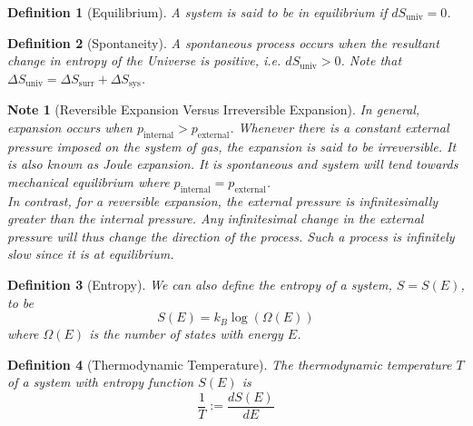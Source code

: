\documentclass[a4paper]{article}
\newtheorem{Note}{Note}[section]
\theoremstyle{new}
\newtheorem{defi}{Definition}[section]
\begin{document}
\begin{defi}[Equilibrium]
A system is said to be in equilibrium if $dS_{\text{univ}}=0$.
\end{defi}
\begin{defi}[Spontaneity]
A spontaneous process occurs when the resultant change in entropy of the Universe is positive, i.e. $dS_{\text{univ}}>0$. Note that $\Delta S_{\text{univ}}=\Delta S_{\text{surr}}+\Delta S_{\text{sys}}$.
\end{defi}
\begin{Note}[Reversible Expansion Versus Irreversible Expansion]
In general, expansion occurs when $p_{\text{internal}}>p_{\text{external}}$. Whenever there is a constant external pressure imposed on the system of gas, the expansion is said to be irreversible. It is also known as Joule expansion. It is spontaneous and system will tend towards mechanical equilibrium where $p_{\text{internal}}=p_{\text{external}}$.\\[5pt]
In contrast, for a reversible expansion, the external pressure is infinitesimally greater than the internal pressure. Any infinitesimal change in the external pressure will thus change the direction of the process. Such a process is infinitely slow since it is at equilibrium.
\end{Note}
\begin{defi}[Entropy]
We can also define the entropy of a system, $S=S(E)$, to be 
\begin{equation}
S(E)=k_B\log(\Omega(E))\label{entropy}
\end{equation}
where $\Omega(E)$ is the number of states with energy $E$.
\end{defi}
\begin{defi}[Thermodynamic Temperature]
The thermodynamic temperature $T$ of a system with entropy function $S(E)$ is
\begin{equation}
\frac{1}{T}:=\frac{dS(E)}{dE}\label{temp}
\end{equation}
\end{defi}
\end{document}
